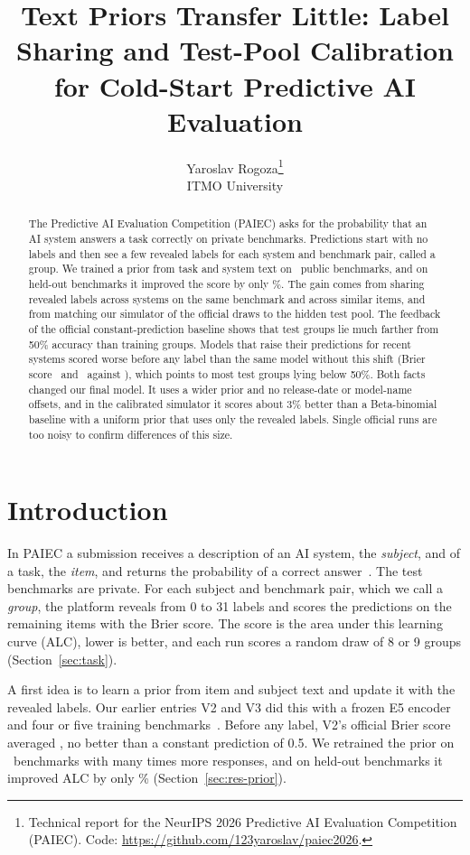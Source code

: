 \documentclass{article}
\title{Text Priors Transfer Little: Label Sharing and Test-Pool Calibration for Cold-Start Predictive AI Evaluation}
\author{Yaroslav Rogoza\thanks{Technical report for the NeurIPS 2026 Predictive AI Evaluation Competition (PAIEC). Code: \url{https://github.com/123yaroslav/paiec2026}.}\\ITMO University}
\begin{document}
\maketitle

\begin{abstract}
The Predictive AI Evaluation Competition (PAIEC) asks for the probability that an AI system answers a task correctly on private benchmarks.
Predictions start with no labels and then see a few revealed labels for each system and benchmark pair, called a group.
We trained a prior from task and system text on \NBenchKept\ public benchmarks, and on held-out benchmarks it improved the score by only \ShortLoboRel\%.
The gain comes from sharing revealed labels across systems on the same benchmark and across similar items, and from matching our simulator of the official draws to the hidden test pool.
The feedback of the official constant-prediction baseline shows that test groups lie much farther from 50\% accuracy than training groups.
Models that raise their predictions for recent systems scored worse before any label than the same model without this shift (Brier score \RSideBzeroLfour\ and \RSideBzeroLfive\ against \RSideBzeroLthree), which points to most test groups lying below 50\%.
Both facts changed our final model.
It uses a wider prior and no release-date or model-name offsets, and in the calibrated simulator it scores about 3\% better than a Beta-binomial baseline with a uniform prior that uses only the revealed labels.
Single official runs are too noisy to confirm differences of this size.
\end{abstract}

\section{Introduction}
\label{sec:intro}
In PAIEC a submission receives a description of an AI system, the \emph{subject}, and of a task, the \emph{item}, and returns the probability of a correct answer~\citep{paiec}.
The test benchmarks are private.
For each subject and benchmark pair, which we call a \emph{group}, the platform reveals from 0 to 31 labels and scores the predictions on the remaining items with the Brier score.
The score is the area under this learning curve (ALC), lower is better, and each run scores a random draw of 8 or 9 groups (Section~\ref{sec:task}).

A first idea is to learn a prior from item and subject text and update it with the revealed labels.
Our earlier entries V2 and V3 did this with a frozen E5 encoder~\citep{e5} and four or five training benchmarks~\citep{prevreport}.
Before any label, V2's official Brier score averaged \ROffVtwoBzeroMean, no better than a constant prediction of 0.5.
We retrained the prior on \NBenchKept\ benchmarks with many times more responses, and on held-out benchmarks it improved ALC by only \ShortLoboRel\% (Section~\ref{sec:res-prior}).
\end{document}
